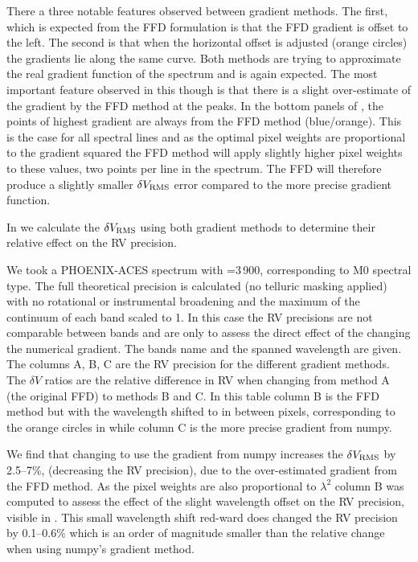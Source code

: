 There a three notable features observed between gradient methods.
The first, which is expected from the {FFD} formulation is that the {FFD} gradient is offset to the left.
The second is that when the horizontal offset is adjusted (orange circles) the gradients lie along the same curve.
Both methods are trying to approximate the real gradient function of the spectrum and is again expected.
The most important feature observed in this though is that there is a slight over-estimate of the gradient by the {FFD} method at the peaks.
In the bottom panels of , the points of highest gradient are always from the {FFD} method (blue/orange).
This is the case for all spectral lines and as the optimal pixel weights are proportional to the gradient squared the {FFD} method will apply slightly higher pixel weights to these values, two points per line in the spectrum.
The {FFD} will therefore produce a slightly smaller \(\delta V_{\textrm{RMS}}\) error compared to the more precise gradient function.

In  we calculate the  \(\delta V_{\textrm{RMS}}\) using both gradient methods to determine their relative effect on the {RV} precision.

We took a {PHOENIX-ACES} spectrum with \teff{}=3\,900\K{}, corresponding to {{M0}} spectral type.
The full theoretical precision is calculated (no telluric masking applied) with no rotational or instrumental broadening and the maximum of the continuum of each band scaled to 1.
In this case the {RV} precisions are not comparable between bands and are only to assess the direct effect of the changing the numerical gradient.
The bands name and the spanned wavelength are given.
The columns A, B, C are the {RV} precision for the different gradient methods.
The \(\delta V\) ratios are the relative difference in {RV} when changing from method A (the original {FFD}) to methods B and C.
In this table column B is the {FFD} method but with the wavelength shifted to in between pixels, corresponding to the orange circles in  while column C is the more precise gradient from numpy.

We find that changing to use the gradient from numpy increases the \(\delta V_{\textrm{RMS}}\) by 2.5--7\%, (decreasing the {RV} precision), due to the over-estimated gradient from the {FFD} method.
As the pixel weights  are also proportional to \({\lambda}^{2}\) column B was computed to assess the effect of the slight wavelength offset on the {RV} precision, visible in .
This small wavelength shift red-ward does changed the {RV} precision by 0.1--0.6\% which is an order of magnitude smaller than the relative change when using numpy's gradient method.

